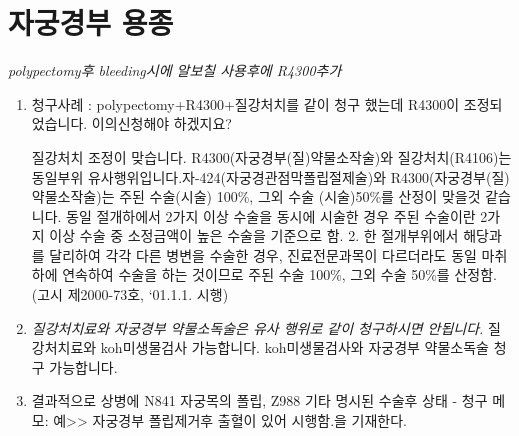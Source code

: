 \section{자궁경부 용종}
%
{
\emph{polypectomy후 bleeding시에 알보칠 사용후에 R4300추가}
	\begin{enumerate}[가.]\tightlist
	\item 청구사례 : polypectomy+R4300+질강처치를 같이 청구 했는데 R4300이 조정되었습니다. 이의신청해야 하겠지요?\par
		질강처치 조정이 맞습니다. R4300(자궁경부(질)약물소작술)와 질강처치(R4106)는 동일부위 유사행위입니다.자-424(자궁경관점막폴립절제술)와  R4300(자궁경부(질)약물소작술)는 주된 수술(시술) 100\%, 그외 수술 (시술)50\%를 산정이 맞을것 같습니다.
		동일 절개하에서 2가지 이상 수술을 동시에 시술한 경우 주된 수술이란 2가지 이상 수술 중 소정금액이 높은 수술을 기준으로 함. 
		2. 한 절개부위에서 해당과를 달리하여 각각 다른 병변을 수술한 경우, 진료전문과목이 다르더라도 동일 마취하에 연속하여 수술을 하는 것이므로 주된 수술 100\%, 그외 수술 50\%를 산정함.(고시 제2000-73호, `01.1.1. 시행)
	\item \emph{질강처치료와  자궁경부 약물소독술은 유사 행위로 같이 청구하시면 안됩니다.} 질강처치료와 koh미생물검사 가능합니다. koh미생물검사와 자궁경부 약물소독술 청구 가능합니다.
	\item 결과적으로 상병에 N841 자궁목의 폴립, Z988 기타 명시된 수술후 상태 - 청구 메모: 예>> 자궁경부 폴립제거후 출혈이 있어 시행함.을 기재한다.
	\end{enumerate}
}

